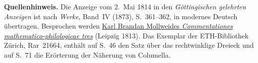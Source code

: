 \par\medskip\begin{small}\noindent\textbf{Quellenhinweis.} Die Anzeige vom 2.~Mai 1814 in den \textit{Göttingischen gelehrten Anzeigen} ist nach \textit{Werke}, Band~IV (1873), S.~361--362, in modernes Deutsch übertragen. Besprochen werden \href{https://www.e-rara.ch/zut/content/titleinfo/15849974}{Karl Brandan Mollweides \textit{Commentationes mathematico-philologicae tres}} (Leipzig 1813). Das Exemplar der ETH-Bibliothek Zürich, Rar~21664, enthält auf S.~46 den Satz über das rechtwinklige Dreieck und auf S.~71 die Erörterung der Näherung von Columella.\par\end{small}
